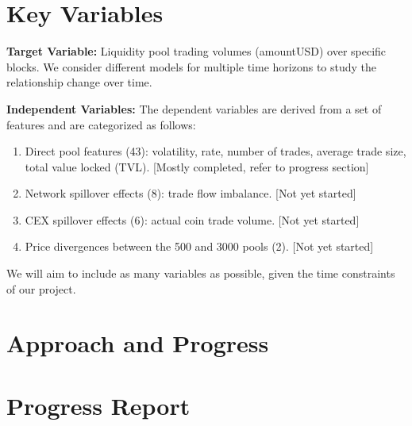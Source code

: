 \documentclass{article}
\begin{document}
{\section*{Key Variables}
\textbf{Target Variable:} Liquidity pool trading volumes (amountUSD) over specific blocks. We consider different models for multiple time horizons to study the relationship change over time.

\textbf{Independent Variables:}
The dependent variables are derived from a set of features and are categorized as follows:
\begin{enumerate}[label=\arabic*. ,itemsep=0pt, topsep=0pt]
\item Direct pool features (43): volatility, rate, number of trades, average trade size, total value locked (TVL). [Mostly completed, refer to progress section]
\item Network spillover effects (8): trade flow imbalance. [Not yet started]
\item CEX spillover effects (6): actual coin trade volume. [Not yet started]
\item Price divergences between the 500 and 3000 pools (2). [Not yet started]
\end{enumerate}
We will aim to include as many variables as possible, given the time constraints of our project.

\section*{Approach and Progress}
\section*{Progress Report}

}
\end{document}

